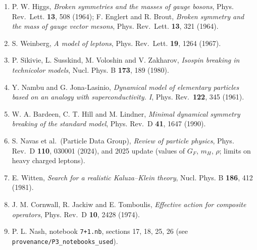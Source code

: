 \documentclass[
  10pt,
]{article}
\providecommand{\tightlist}{%
  \setlength{\itemsep}{0pt}\setlength{\parskip}{0pt}}
\begin{document}
\begin{enumerate}
\def\labelenumi{\arabic{enumi}.}
\tightlist
\item
  P. W. Higgs, \emph{Broken symmetries and the masses of gauge bosons},
  Phys. Rev.~Lett. \textbf{13}, 508 (1964); F. Englert and R. Brout,
  \emph{Broken symmetry and the mass of gauge vector mesons}, Phys.
  Rev.~Lett. \textbf{13}, 321 (1964).
\item
  S. Weinberg, \emph{A model of leptons}, Phys. Rev.~Lett. \textbf{19},
  1264 (1967).
\item
  P. Sikivie, L. Susskind, M. Voloshin and V. Zakharov, \emph{Isospin
  breaking in technicolor models}, Nucl. Phys. B \textbf{173}, 189
  (1980).
\item
  Y. Nambu and G. Jona-Lasinio, \emph{Dynamical model of elementary
  particles based on an analogy with superconductivity. I}, Phys.
  Rev.~\textbf{122}, 345 (1961).
\item
  W. A. Bardeen, C. T. Hill and M. Lindner, \emph{Minimal dynamical
  symmetry breaking of the standard model}, Phys. Rev.~D \textbf{41},
  1647 (1990).
\item
  S. Navas et al.~(Particle Data Group), \emph{Review of particle
  physics}, Phys. Rev.~D \textbf{110}, 030001 (2024), and 2025 update
  (values of \(G_F\), \(m_H\), \(\rho\); limits on heavy charged
  leptons).
\item
  E. Witten, \emph{Search for a realistic Kaluza--Klein theory}, Nucl.
  Phys. B \textbf{186}, 412 (1981).
\item
  J. M. Cornwall, R. Jackiw and E. Tomboulis, \emph{Effective action for
  composite operators}, Phys. Rev.~D \textbf{10}, 2428 (1974).
\item
  P. L. Nash, notebook \texttt{7+1.nb}, sections 17, 18, 25, 26 (see
  \texttt{provenance/P3\_notebooks\_used}).
\end{enumerate}
\end{document}
